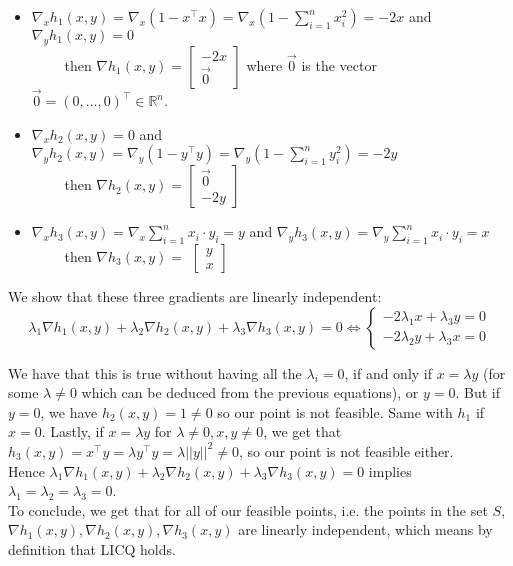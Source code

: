 \documentclass{article}
\newcommand{\R}{\mathbb{R}}
\newcommand{\tp}{^\top}
\begin{document}
\begin{itemize}
\item  $\nabla_x h_1(x,y)=\nabla_x \left(1-x\tp x\right)= \nabla_x \left(1-\sum_{i=1}^n x_{i}^2 \right)=-2x$  and $\nabla_y h_1(x,y)=0$ \\

$\qquad$ then $\nabla h_1(x,y)=
\begin{bmatrix}
-2 x\\
\vec{0}
\end{bmatrix}
$ where $\vec{0}$ is the vector $\vec{0}=(0,\dots,0)\tp \in \R^n$.
\item  $\nabla_x h_2(x,y)=0$ and $\nabla_y h_2(x,y)=\nabla_y \left(1-y\tp y\right)= \nabla_y \left(1-\sum_{i=1}^n y_{i}^2 \right)=-2 y$ \\

$\qquad$ then $\nabla h_2(x,y)=
\begin{bmatrix}
\vec{0}\\
-2y
\end{bmatrix}
$
\item $\nabla_x h_3(x,y)= \nabla_x \sum_{i=1}^n x_i \cdot y_i=y$ and  $\nabla_y h_3(x,y)= \nabla_y \sum_{i=1}^n x_i \cdot y_i= x$\\

$\qquad$ then $\nabla h_3(x,y)=$
$
\begin{bmatrix}
y\\
x
\end{bmatrix}
$
\end{itemize} 

\noindent We show that these three gradients are linearly independent:\\
$$\lambda_1 \nabla h_1(x,y)+\lambda_2\nabla h_2(x,y)+\lambda_3 \nabla h_3(x,y)=0 \iff \begin{cases}- 2 \lambda_1 x + \lambda_3 y=0\\ -2 \lambda_2 y+  \lambda_3 x=0\end{cases}$$ 

We have that this is true without having all the $\lambda_i=0$, if and only if $x=\lambda y$ (for some $\lambda\neq 0$ which can be deduced from the previous equations), or $y=0$. But if $y=0$, we have $h_2(x,y)=1\neq 0$ so our point is not feasible. Same with $h_1$ if $x=0$. Lastly, if $x=\lambda y$ for $\lambda\neq 0, x, y \neq 0$, we get that $h_3(x,y)=x\tp y=\lambda y\tp y=\lambda ||y||^2 \neq 0$, so our point is not feasible either.\\
Hence $\lambda_1 \nabla h_1(x,y)+\lambda_2\nabla h_2(x,y)+\lambda_3 \nabla h_3(x,y)=0$ implies $\lambda_1=\lambda_2=\lambda_3=0$.\\
To conclude, we get that for all of our feasible points, i.e. the points in the set $S$, $ \nabla h_1(x,y), \nabla h_2(x,y), \nabla h_3(x,y)$ are linearly independent, which means by definition that LICQ holds.
\end{document}
